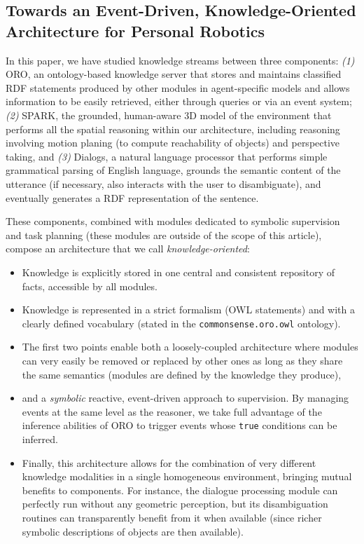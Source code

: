 \documentclass{svmult}
\begin{document}
\subsection{Towards an Event-Driven, Knowledge-Oriented Architecture for Personal Robotics}

In this paper, we have studied knowledge streams between three components: {\it(1)}
{\sc ORO}, an ontology-based knowledge server that stores and maintains
classified RDF statements produced by other modules in agent-specific
models and allows information to be easily retrieved, either through queries or
via an event system; {\it(2)} {\sc SPARK}, the grounded, human-aware 3D model
of the environment that performs all the spatial reasoning within our
architecture, including reasoning involving motion planing (to compute
reachability of objects) and perspective taking, and {\it(3)} {\sc Dialogs}, a
natural language processor that performs simple grammatical parsing of English
language, grounds the semantic content of the utterance (if necessary, also
interacts with the user to disambiguate), and eventually generates a RDF
representation of the sentence.

These components, combined with modules dedicated to symbolic supervision and
task planning (these modules are outside of the scope of this article), compose
an architecture that we call \emph{knowledge-oriented}:

\begin{itemize}
\item{Knowledge is explicitly stored in one central and consistent repository
of facts, accessible by all modules.}
\item{Knowledge is represented in a strict formalism (OWL statements) and
with a clearly defined vocabulary (stated in the {\tt commonsense.oro.owl}
ontology).}
\item{The first two points enable both a loosely-coupled
architecture where modules can very easily be removed or replaced by other ones
as long as they share the same semantics (modules are defined by the knowledge
they produce),}
\item{and a \emph{symbolic} reactive, event-driven approach
to supervision. By managing events at the same level as
the reasoner, we take full advantage of the inference abilities of ORO to
trigger events whose \texttt{true} conditions can be inferred.}
\item{Finally, this architecture allows for the combination of very different knowledge
modalities in a single homogeneous environment, bringing mutual benefits to
components. For instance, the dialogue processing module can perfectly run
without any geometric perception, but its disambiguation routines can
transparently benefit from it when available (since richer symbolic
descriptions of objects are then available).}
\end{itemize}
\end{document}
